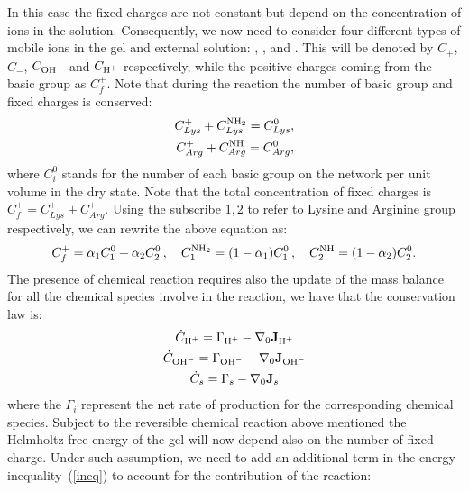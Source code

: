 \documentclass[12pt]{extarticle}
\begin{document}
\vspace{2mm}
\begin{centering}
\end{centering}

In this case the fixed charges are not constant but depend on the concentration of  ions in the solution. Consequently, we now need to consider four different types of mobile ions in the gel and external solution: , ,  and . This will be denoted by $C_+$, $C_-$, $C_{\ce{OH-}}$ and $C_{\ce{H+}}$ respectively, while the positive charges coming from the basic group as $C_{f}^+$. Note that during the reaction the number of basic group and fixed charges is conserved:
\begin{equation}
\begin{aligned}
C_{Lys}^+ + C^{\ce{NH2}}_{Lys}=C^0_{Lys},\\
C_{Arg}^+ + C^{\ce{NH}}_{Arg}= C^0_{Arg},
\end{aligned}
\end{equation}
where $C^0_i$ stands for the number of each basic group on the network per unit volume in the dry state. Note that the total concentration of fixed charges is $C_f^+=C_{Lys}^+ + C_{Arg}^+$. Using the subscribe $1,2$ to refer to Lysine and Arginine group respectively, we can rewrite the above equation as: 
\begin{equation}
C_f^+ = \alpha_1 C^0_1+\alpha_2 C^0_2\,, \quad C^{\ce{NH2}}_1=(1-\alpha_1)C^0_1\,, \quad C^{\ce{NH}}_2=(1-\alpha_2)C^0_2 . 
\end{equation}
The presence of chemical reaction requires also the update of the mass balance for all the chemical species involve in the reaction, we have that the conservation law is:
\begin{gather}
\dot{C}_{\ce{H+}}= \Gamma_{\ce{H+}} - \nabla_0 \mathbf{J}_{\ce{H+}}\\
\dot{C}_{\ce{OH-}}= \Gamma_{\ce{OH-}} - \nabla_0 \mathbf{J}_{\ce{OH-}}\\
\dot{C}_s= \Gamma_s - \nabla_0 \mathbf{J}_{s}
\end{gather}
where the $\Gamma_i$ represent the net rate of production for the corresponding chemical species. 
Subject to the reversible chemical reaction above mentioned the Helmholtz free energy of the gel will now depend also on the number of fixed-charge. Under such assumption, we need to add an additional term in the energy inequality~(\ref{ineq}) to account for the contribution of the reaction:
\end{document}
